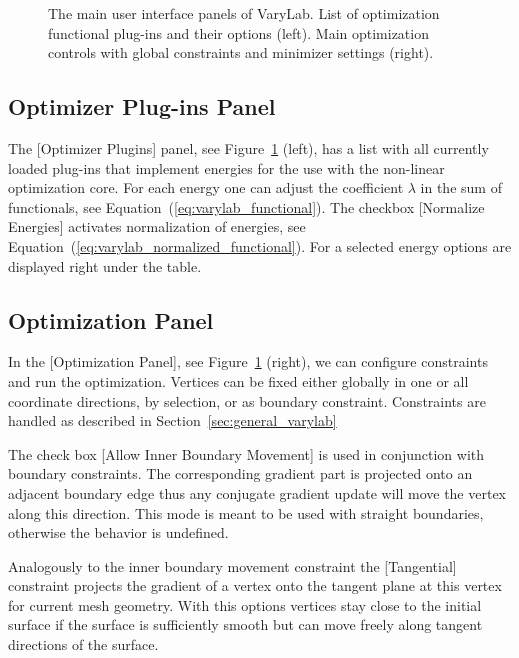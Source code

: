 \documentclass[Thesis.tex]{subfiles}
\begin{document}
\begin{figure}
\begin{center}
\caption{The main user interface panels of {\sc VaryLab}. List of optimization functional plug-ins and their options (left). Main optimization controls with global constraints and minimizer settings (right).}
\label{fig:optimization_interface_varylab}
\end{center}
\end{figure}

\subsection*{Optimizer Plug-ins Panel}
The [Optimizer Plugins] panel, see Figure~\ref{fig:optimization_interface_varylab} (left), has a list with all currently loaded plug-ins that implement energies for the use with the non-linear optimization core. For each energy one can adjust the coefficient $\lambda$ in the sum of functionals, see Equation~(\ref{eq:varylab_functional}).
The checkbox [Normalize Energies] activates normalization of energies, see Equation~(\ref{eq:varylab_normalized_functional}). For a selected energy options are displayed right under the table.

\subsection*{Optimization Panel}
In the [Optimization Panel], see Figure~\ref{fig:optimization_interface_varylab} (right), we can configure constraints and run the optimization. Vertices can be fixed either globally in one or all coordinate directions, by selection, or as boundary constraint. Constraints are handled as described in Section~\ref{sec:general_varylab}

The check box [Allow Inner Boundary Movement] is used in conjunction with boundary constraints. The corresponding gradient part is projected onto an adjacent boundary edge thus any conjugate gradient update will move the vertex along this direction. This mode is meant to be used with straight boundaries, otherwise the behavior is undefined.

Analogously to the inner boundary movement constraint the [Tangential]
 constraint projects the gradient of a vertex onto the tangent plane at this vertex for current mesh geometry. With this options vertices stay close to the initial surface if the surface is sufficiently smooth but can move freely along tangent directions of the surface.
\end{document}
